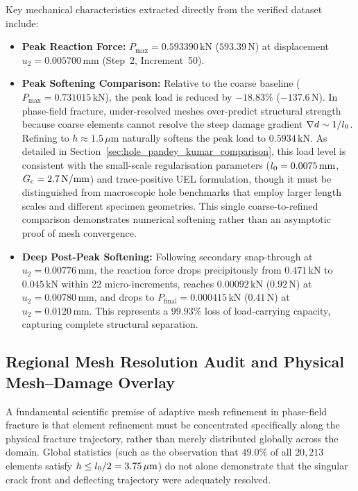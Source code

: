 Key mechanical characteristics extracted directly from the verified dataset include:
\begin{itemize}
  \item \textbf{Peak Reaction Force:} $P_{\max} = 0.593390\,\mathrm{kN}$ ($593.39\,\mathrm{N}$) at displacement $u_2 = 0.005700\,\mathrm{mm}$ (Step~2, Increment~50).
  \item \textbf{Peak Softening Comparison:} Relative to the coarse baseline ($P_{\max} = 0.731015\,\mathrm{kN}$), the peak load is reduced by $-18.83\%$ ($-137.6\,\mathrm{N}$). In phase-field fracture, under-resolved meshes over-predict structural strength because coarse elements cannot resolve the steep damage gradient $\nabla d \sim 1/l_0$. Refining to $h \approx 1.5\,\mu\mathrm{m}$ naturally softens the peak load to $0.5934\,\mathrm{kN}$. As detailed in Section~\ref{sec:hole_pandey_kumar_comparison}, this load level is consistent with the small-scale regularisation parameters ($l_0 = 0.0075\,\mathrm{mm}$, $G_{\mathrm{c}} = 2.7\,\mathrm{N/mm}$) and trace-positive UEL formulation, though it must be distinguished from macroscopic hole benchmarks that employ larger length scales and different specimen geometries. This single coarse-to-refined comparison demonstrates numerical softening rather than an asymptotic proof of mesh convergence.
  \item \textbf{Deep Post-Peak Softening:} Following secondary snap-through at $u_2 = 0.00776\,\mathrm{mm}$, the reaction force drops precipitously from $0.471\,\mathrm{kN}$ to $0.045\,\mathrm{kN}$ within 22 micro-increments, reaches $0.00092\,\mathrm{kN}$ ($0.92\,\mathrm{N}$) at $u_2 = 0.00780\,\mathrm{mm}$, and drops to $P_{\mathrm{final}} = 0.000415\,\mathrm{kN}$ ($0.41\,\mathrm{N}$) at $u_2 = 0.0120\,\mathrm{mm}$. This represents a $99.93\%$ loss of load-carrying capacity, capturing complete structural separation.
\end{itemize}

\subsection{Regional Mesh Resolution Audit and Physical Mesh--Damage Overlay}
\label{subsec:hole_regional_resolution}

A fundamental scientific premise of adaptive mesh refinement in phase-field fracture is that element refinement must be concentrated specifically along the physical fracture trajectory, rather than merely distributed globally across the domain. Global statistics (such as the observation that $49.0\%$ of all $20{,}213$ elements satisfy $h \le l_0 / 2 = 3.75\,\mu\mathrm{m}$) do not alone demonstrate that the singular crack front and deflecting trajectory were adequately resolved.

